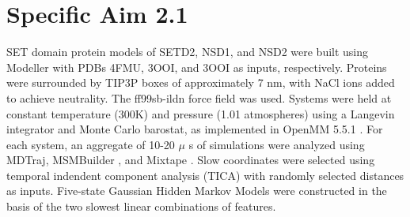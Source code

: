\documentclass[12pt]{article}
\begin{document}
\section{Specific Aim 2.1}

SET domain protein models of SETD2, NSD1, and NSD2 were built using Modeller with PDBs 4FMU, 3OOI, and 3OOI as inputs, respectively.  Proteins were surrounded by TIP3P boxes of approximately 7 nm, with NaCl ions added to achieve neutrality.  The ff99sb-ildn force field \cite{} was used.  Systems were held at constant temperature (300K) and pressure (1.01 atmospheres) using a Langevin integrator and Monte Carlo barostat, as implemented in OpenMM 5.5.1 \cite{}.  For each system, an aggregate of 10-20 $\mu$ s of simulations were analyzed using MDTraj, MSMBuilder \cite{}, and Mixtape \cite{}.  Slow coordinates were selected using temporal indendent component analysis (TICA) \cite{} with randomly selected distances as inputs.  Five-state Gaussian Hidden Markov Models were constructed in the basis of the two slowest linear combinations of features.  
\end{document}
